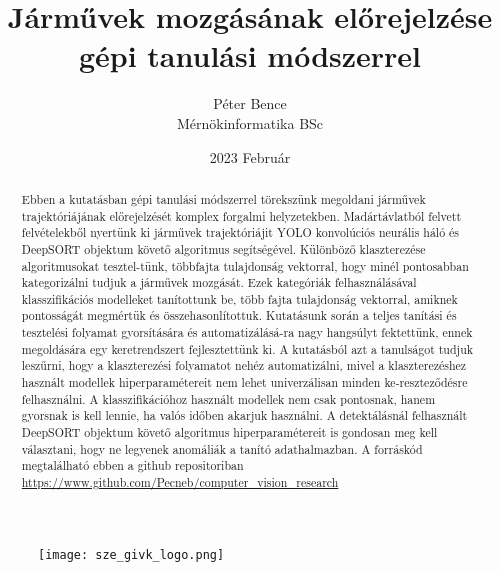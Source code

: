 \documentclass{article}
\title{Járművek mozgásának előrejelzése gépi tanulási módszerrel}
\author{Péter Bence\\Mérnökinformatika BSc}
\date{2023 Február}
\begin{document}
    
    \maketitle
    \begin{figure}[H]\centering
        \texttt{[image: sze\_givk\_logo.png]}
    \end{figure}
    \newpage
    \begin{abstract}
        Ebben a kutatásban gépi tanulási módszerrel törekszünk megoldani
        járművek trajektóriájának előrejelzését komplex forgalmi helyzetekben.
        Madártávlatból felvett felvételekből nyertünk ki járművek trajektóriájit 
        YOLO\cite{wang2022yolov7} konvolúciós neurális háló és DeepSORT\cite{Wojke2018deep} 
        objektum követő algoritmus segítségével. Különböző klaszterezése algoritmusokat 
        tesztel-tünk, többfajta tulajdonság vektorral, hogy minél pontosabban kategorizálni 
        tudjuk a járművek mozgását. Ezek kategóriák felhasználásával klasszifikációs modelleket 
        tanítottunk be, több fajta tulajdonság vektorral, amiknek pontosságát megmértük 
        és összehasonlítottuk. Kutatásunk során a teljes tanítási és tesztelési folyamat 
        gyorsítására és automatizálásá-ra nagy hangsúlyt fektettünk, ennek megoldására egy 
        keretrendszert fejlesztettünk ki. A kutatásból azt a tanulságot tudjuk leszűrni,
        hogy a klaszterezési folyamatot nehéz automatizálni, mivel a klaszterezéshez
        használt modellek hiperparamétereit nem lehet univerzálisan minden ke-reszteződésre 
        felhasználni. A klasszifikációhoz használt modellek nem csak pontosnak,
        hanem gyorsnak is kell lennie, ha valós időben akarjuk használni.
        A detektálásnál felhasznált DeepSORT\cite{Wojke2018deep} objektum követő algoritmus
        hiperparamétereit is gondosan meg kell választani, hogy ne legyenek anomáliák a tanító
        adathalmazban. A forráskód megtalálható ebben a github repositoriban \url{https://www.github.com/Pecneb/computer_vision_research}
    \end{abstract}
    \tableofcontents
    
\end{document}

